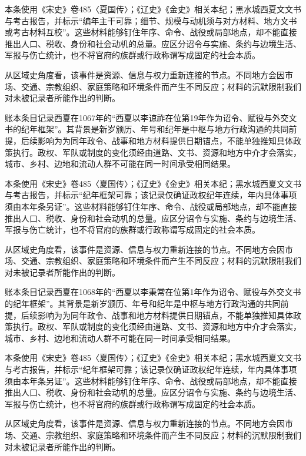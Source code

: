 本条使用《宋史》卷485〈夏国传〉；《辽史》《金史》相关本纪；黑水城西夏文文书与考古报告，并标示“编年主干可靠；细节、规模与动机须与对方材料、地方文书或考古材料互校”。这些材料能够钉住年序、命令、战役或局部地点，却不能直接推出人口、税收、身份和社会动机的总量。应区分诏令与实施、条约与边境生活、军报与伤亡统计，也不将官府的族群或行政称谓写成固定的社会本质。

从区域史角度看，该事件是资源、信息与权力重新连接的节点。不同地方会因市场、交通、宗教组织、家庭策略和环境条件而产生不同反应；材料的沉默限制我们对未被记录者所能作出的判断。

账本条目记录西夏在1067年的“西夏以李谅祚在位第19年作为诏令、赋役与外交文书的纪年框架”。其背景是新岁颁历、年号和纪年是中枢与地方行政沟通的共同前提，后续影响为为同年政令、战事和地方材料提供日期锚点，不能单独推知具体政策执行。政权、军队或制度的变化须经由道路、文书、资源和地方中介才会落实，城市、乡村、边地和流动人群不可能在同一时间承受相同结果。

本条使用《宋史》卷485〈夏国传〉；《辽史》《金史》相关本纪；黑水城西夏文文书与考古报告，并标示“纪年框架可靠；该记录仅确证政权纪年连续，年内具体事项须由本年条另证”。这些材料能够钉住年序、命令、战役或局部地点，却不能直接推出人口、税收、身份和社会动机的总量。应区分诏令与实施、条约与边境生活、军报与伤亡统计，也不将官府的族群或行政称谓写成固定的社会本质。

从区域史角度看，该事件是资源、信息与权力重新连接的节点。不同地方会因市场、交通、宗教组织、家庭策略和环境条件而产生不同反应；材料的沉默限制我们对未被记录者所能作出的判断。

账本条目记录西夏在1068年的“西夏以李秉常在位第1年作为诏令、赋役与外交文书的纪年框架”。其背景是新岁颁历、年号和纪年是中枢与地方行政沟通的共同前提，后续影响为为同年政令、战事和地方材料提供日期锚点，不能单独推知具体政策执行。政权、军队或制度的变化须经由道路、文书、资源和地方中介才会落实，城市、乡村、边地和流动人群不可能在同一时间承受相同结果。

本条使用《宋史》卷485〈夏国传〉；《辽史》《金史》相关本纪；黑水城西夏文文书与考古报告，并标示“纪年框架可靠；该记录仅确证政权纪年连续，年内具体事项须由本年条另证”。这些材料能够钉住年序、命令、战役或局部地点，却不能直接推出人口、税收、身份和社会动机的总量。应区分诏令与实施、条约与边境生活、军报与伤亡统计，也不将官府的族群或行政称谓写成固定的社会本质。

从区域史角度看，该事件是资源、信息与权力重新连接的节点。不同地方会因市场、交通、宗教组织、家庭策略和环境条件而产生不同反应；材料的沉默限制我们对未被记录者所能作出的判断。

